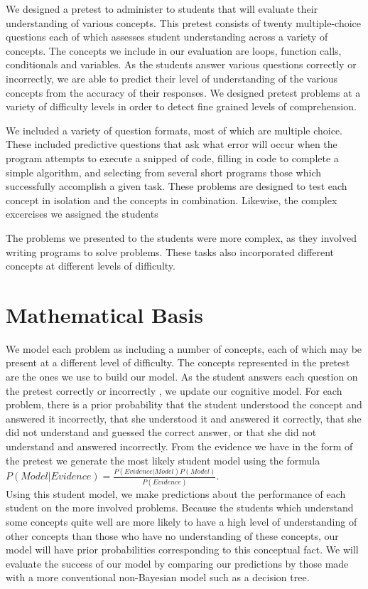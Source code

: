 \documentclass[twocolumn]{article}
\begin{document}
We designed a pretest to administer to students that will evaluate their understanding of various concepts.  This pretest consists of twenty multiple-choice questions each of which assesses student understanding across a variety of concepts.  The concepts we include in our evaluation are loops, function calls, conditionals and variables.  As the students answer various questions correctly or incorrectly, we are able to predict their level of understanding of the various concepts from the accuracy of their responses.  We designed pretest problems at a variety of difficulty levels in order to detect fine grained levels of comprehension.

We included a variety of question formats, most of which are multiple choice.  These included predictive questions that ask what error will occur when the program attempts to execute a snipped of code, filling in code to complete a simple algorithm, and selecting from several short programs those which successfully accomplish a given task.  These problems are designed to test each concept in isolation and the concepts in combination.  Likewise, the complex excercises we assigned the students

The problems we presented to the students were more complex, as they involved writing programs to solve problems.  These tasks also incorporated different concepts at different levels of difficulty. 

\section{Mathematical Basis}
\label{sec:math-basis}
We model each problem as including a number of concepts, each of which may be present at a different level of difficulty.  The concepts represented in the pretest are the ones we use to build our model.  As the student answers each question on the pretest correctly or incorrectly , we update our cognitive model.  For each problem, there is a prior probability that the student understood the concept and answered it incorrectly, that she understood it and answered it correctly, that she did not understand and guessed the correct answer, or that she did not understand and answered incorrectly.  From the evidence we have in the form of the pretest we generate the most likely student model using the formula \\
$P(Model|Evidence) = \frac{P(Evidence|Model)P(Model)}{P(Evidence)}$. \\
 Using this student model, we make predictions about the performance of each student on the more involved problems. 
Because the students which understand some concepts quite well are more likely to have a high level of understanding of other concepts than those who have no understanding of these concepts, our model will have prior probabilities corresponding to this conceptual fact.
We will evaluate the success of our model by comparing our predictions by those made with a more conventional non-Bayesian model such as a decision tree.
\end{document}
